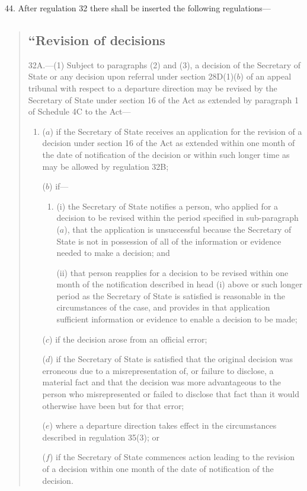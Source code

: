 \documentclass[12pt,a4paper]{article}
\begin{document}
44.  After regulation 32 there shall be inserted the following regulations---
\begin{quotation}
\subsection*{“Revision of decisions}

32A.—(1) Subject to paragraphs (2) and (3), a decision of the Secretary of State or any decision upon referral under section 28D(1)($b$) of an appeal tribunal with respect to a departure direction may be revised by the Secretary of State under section 16 of the Act as extended by paragraph 1 of Schedule 4C to the Act---
\begin{enumerate}\item[]
($a$) if the Secretary of State receives an application for the revision of a decision under section 16 of the Act as extended within one month of the date of notification of the decision or within such longer time as may be allowed by regulation 32B;

($b$) if---
\begin{enumerate}\item[]
(i) the Secretary of State notifies a person, who applied for a decision to be revised within the period specified in sub-paragraph ($a$), that the application is unsuccessful because the Secretary of State is not in possession of all of the information or evidence needed to make a decision; and

(ii) that person reapplies for a decision to be revised within one month of the notification described in head (i) above or such longer period as the Secretary of State is satisfied is reasonable in the circumstances of the case, and provides in that application sufficient information or evidence to enable a decision to be made;
\end{enumerate}

($c$) if the decision arose from an official error;

($d$) if the Secretary of State is satisfied that the original decision was erroneous due to a misrepresentation of, or failure to disclose, a material fact and that the decision was more advantageous to the person who misrepresented or failed to disclose that fact than it would otherwise have been but for that error;

($e$) where a departure direction takes effect in the circumstances described in regulation 35(3); or

($f$) if the Secretary of State commences action leading to the revision of a decision within one month of the date of notification of the decision.
\end{enumerate}


\end{quotation}
\end{document}
